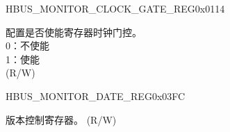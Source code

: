 \begin{register}{H}{BUS\_MONITOR\_CLOCK\_GATE\_REG}{0x0114}\label{regdesc:BUSMONITORCLOCKGATEREG}
%
%
\regnewline%
\begin{regdesc}\begin{reglist}
\label{fielddesc:BUSMONITORCLKEN}\item [BUS\_MONITOR\_CLK\_EN] 配置是否使能寄存器时钟门控。\\
0：不使能\\
1：使能\\ (R/W)
\end{reglist}\end{regdesc}
\end{register}


\begin{register}{H}{BUS\_MONITOR\_DATE\_REG}{0x03FC}\label{regdesc:BUSMONITORDATEREG}
%
%
\regnewline%
\begin{regdesc}\begin{reglist}
\label{fielddesc:BUSMONITORDATE}\item [BUS\_MONITOR\_DATE] 版本控制寄存器。 (R/W)
\end{reglist}\end{regdesc}
\end{register}

